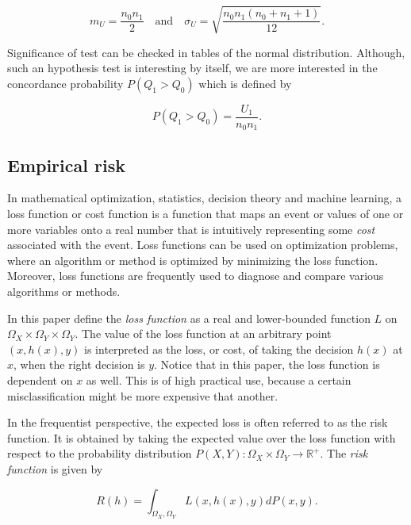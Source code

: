 \documentclass{article}
\theoremstyle{theorem}
\theoremstyle{definition}
\begin{document}
\begin{equation}
\label{eq:z}
m_U = \frac{n_0n_1}{2} \quad \mbox{and} \quad 
\sigma_U = \sqrt{\frac{n_0n_1(n_0 + n_1 + 1)}{12} }.
\end{equation}

Significance of test can be checked in tables of the normal distribution.  Although, such an hypothesis test is interesting by itself, we are more interested in the concordance probability $P(Q_1 > Q_0)$ which is defined by

\begin{equation}
\label{eq:concordance}
P(Q_1 > Q_0) = \frac{U_1}{n_0n_1}.
\end{equation}


\subsection{Empirical risk}
\label{sec:empRisk}

In mathematical optimization, statistics, decision theory and machine learning, a loss function or cost function is a function that maps an event or values of one or more variables onto a real number that is intuitively representing some \emph{cost} associated with the event. Loss functions can be used on optimization problems, where an algorithm or method is optimized by minimizing the loss function.  Moreover, loss functions are frequently used to diagnose and compare various algorithms or methods.  

In this paper define the \emph{loss function} as a real and lower-bounded function $L$ on $\Omega_X \times \Omega_Y \times \Omega_Y$.  The value of the loss function at an arbitrary point $(x, h(x), y)$ is interpreted as the loss, or cost, of taking the decision $h(x)$ at $x$, when the right decision is $y$.  Notice that in this paper, the loss function is dependent on $x$ as well.  This is of high practical use, because a certain misclassification might be more expensive that another. 

In the frequentist perspective, the expected loss is often referred to as the risk function.  It is obtained by taking the expected value over the loss function with respect to the probability distribution $P(X,Y): \Omega_X\times \Omega_Y \rightarrow \mathbb{R}^+$.  The \emph{risk function} is given by

\begin{equation}
\label{def:risk}
R(h) = \int_{\Omega_X,\Omega_Y} L(x,h(x),y) dP(x,y).
\end{equation}
\end{document}
